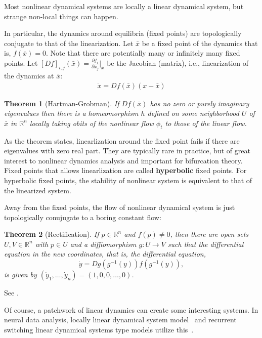 \documentclass[a4paper,11pt]{exam}
\newtheorem{theorem}{Theorem}
\newcounter{ct}
\newcommand{\inv}{^{-1}}
\newcommand{\field}[1]{\ensuremath{\mathbb{#1}}}
\newcommand{\reals}{\field{R}}
\begin{document}
\begin{questions}
\begin{tcolorbox}[colback=black!1!,title=Linearize that beast!]
    Most nonlinear dynamical systems are locally a linear dynamical system, but strange non-local things can happen.
\end{tcolorbox}

In particular, the dynamics around equilibria (fixed points) are topologically conjugate to that of the linearization.
Let $\bar{x}$ be a fixed point of the dynamics that is, $f(\bar{x}) = 0$.
Note that there are potentially many or infinitely many fixed points.
Let $[Df]_{i,j}(\bar{x}) = \frac{\partial f_i}{\partial x_j}\bigr\rvert_{\bar{x}}$ be the Jacobian (matrix), i.e., linearization of the dynamics at $\bar{x}$:
\begin{align}\label{eq:linearized_around_FP}
    \dot{x} = Df(\bar{x}) (x - \bar{x})
\end{align}


\begin{theorem}[Hartman-Grobman]
    If $Df(\bar{x})$ has no zero or purely imaginary eigenvalues then there is a homeomorphism $h$ defined on some neighborhood $U$ of $\bar{x}$ in $\reals^n$ locally taking obits of the nonlinear flow $\phi_t$ to those of the linear flow.
\end{theorem}
As the theorem states, linearlization around the fixed point fails if there are eigenvalues with zero real part.
They are typically rare in practice, but of great interest to nonlinear dynamics analysis and important for bifurcation theory.
Fixed points that allows linearlization are called \textbf{hyperbolic} fixed points.
For hyperbolic fixed points, the stability of nonlinear system is equivalent to that of the linearized system.

Away from the fixed points, the flow of nonlinear dynamical system is just topologically conujugate to a boring constant flow:
\begin{theorem}[Rectification]
    If $p \in \reals^n$ and $f(p) \neq 0$, then there are open sets $U, V \in \reals^n$ with $p \in U$ and a diffiomorphism $g: U \to V$ such that the differential equation in the new coordinates, that is, the differential equation,
    $$ \dot{y} = Dg(g\inv(y)) f(g\inv(y)), $$
is given by $(\dot{y}_1, \ldots, \dot{y}_n) = (1, 0, 0, \ldots, 0)$.
\end{theorem}
See \citet[Lemma 1.120]{Chicone2006}.

Of course, a patchwork of linear dynamics can create some interesting systems.
In neural data analysis, locally linear dynamical system model~\cite{Zhao2016d} and recurrent switching linear dynamical systems type models utilize this~\citep{Linderman2017,Nassar2018b}.


\end{questions}
\end{document}
